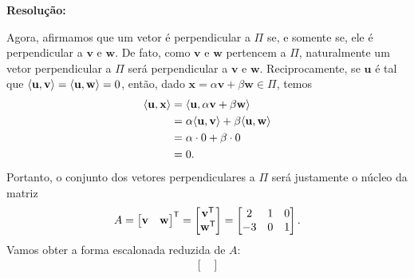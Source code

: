 \documentclass[leqno]{article}
\numberwithin{equation}{section}
\newcommand{\bfw}{\mathbf{w}}
\newcommand{\bfv}{\mathbf{v}}
\newcommand{\bfu}{\mathbf{u}}
\newcommand{\bfx}{\mathbf{x}}
\newenvironment{sol}
{
    \vspace{4mm}
    \noindent\textbf{Resolução:}
    \strut\newline
    \smallskip
    \hspace{-3.5mm}
}
{}
\begin{document}
\begin{enumerate}
\begin{sol}
            Agora, afirmamos que um vetor é perpendicular a \( \Pi \) se, e somente se, ele é perpendicular a \( \bfv \) e \( \bfw \).
            De fato, como \( \bfv \) e \( \bfw \) pertencem a \( \Pi \), naturalmente um vetor perpendicular a \( \Pi \) será perpendicular a \( \bfv \) e \( \bfw \).
            Reciprocamente, se \( \bfu \) é tal que \( \dotprod{\bfu, \bfv} = \dotprod{\bfu, \bfw} = 0 \), então, dado \( \bfx = \alpha \bfv + \beta \bfw \in \Pi \), temos
            \begin{align*}
                \dotprod{\bfu, \bfx} &= \dotprod{\bfu, \alpha \bfv + \beta \bfw} \\
                                     &= \alpha \dotprod{\bfu, \bfv} + \beta \dotprod{\bfu, \bfw} \\
                                     &= \alpha \cdot 0 + \beta \cdot 0 \\
                                     &= 0
                                 .\end{align*}
                             \end{sol} 
                             Portanto, o conjunto dos vetores perpendiculares a \( \Pi \) será justamente o núcleo da matriz
                             \begin{equation*}
                                 A =
                                 \begin{bmatrix}
                                     \bfv & \bfw
                                 \end{bmatrix}^{ \transpose }
                                 =
                                 \begin{bmatrix}
                                     \bfv^{ \transpose } \\
                                     \bfw^{ \transpose }
                                 \end{bmatrix}
                                 =
                                 \begin{bmatrix}
                                     2 & 1 & 0 \\
                                     -3 & 0 & 1
                                 \end{bmatrix}
                             .\end{equation*}
                             Vamos obter a forma escalonada reduzida de \( A \):
                             \begin{align*}
                                 \begin{bmatrix}

\end{bmatrix}
\end{align*}
\end{enumerate}
\end{document}

